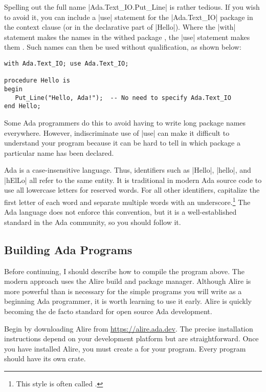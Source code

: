 Spelling out the full name |Ada.Text_IO.Put_Line| is rather tedious. If you wish to avoid it,
you can include a |use| statement for the |Ada.Text_IO| package in the context clause (or in the
declarative part of |Hello|). Where the |with| statement makes the names in the withed package
, the |use| statement makes them . Such names can
then be used without qualification, as shown below:

\begin{lstlisting}
with Ada.Text_IO; use Ada.Text_IO;

procedure Hello is
begin
   Put_Line("Hello, Ada!");  -- No need to specify Ada.Text_IO
end Hello;
\end{lstlisting}

\noindent Some Ada programmers do this to avoid having to write long package names everywhere.
However, indiscriminate use of |use| can make it difficult to understand your program because it
can be hard to tell in which package a particular name has been declared.

Ada is a case-insensitive language. Thus, identifiers such as |Hello|, |hello|, and |hElLo| all
refer to the same entity. It is traditional in modern Ada source code to use all lowercase
letters for reserved words. For all other identifiers, capitalize the first letter of each word
and separate multiple words with an underscore.\footnote{This style is often called
.} The Ada language does not enforce this convention, but it is a
well-established standard in the Ada community, so you should follow it.

\subsection{Building Ada Programs}

Before continuing, I should describe how to compile the program above. The modern approach uses
the Alire build and package manager. Although Alire is more powerful than is necessary for the
simple programs you will write as a beginning Ada programmer, it is worth learning to use it
early. Alire is quickly becoming the de facto standard for open source Ada development.

Begin by downloading Alire from \url{https://alire.ada.dev}. The precise installation
instructions depend on your development platform but are straightforward. Once you have
installed Alire, you must create a  for your program. Every program should have
its own crate.

